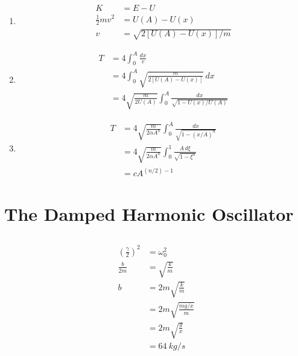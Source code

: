 \documentclass{article}
\begin{document}
\begin{enumerate}
  \item

        \begin{align*}
          K                 & = E - U                      \\
          \frac{1}{2} m v^2 & = U(A) - U(x)                \\
          v                 & = \sqrt{2 [U(A) - U(x)] / m}
        \end{align*}

  \item

        \begin{align*}
          T & = 4 \int_0^A \frac{dx}{v}                                              \\
            & = 4 \int_0^A \sqrt{\frac{m}{2 [U(A) - U(x)]}} \,dx                     \\
            & = 4 \sqrt{\frac{m}{2 U(A)}} \int_0^A \frac{dx}{\sqrt{1 - U(x) / U(A)}}
        \end{align*}

  \item

        \begin{align*}
          T & = 4 \sqrt{\frac{m}{2 \alpha A^n}} \int_0^A \frac{dx}{\sqrt{1 - (x / A)^n}}    \\
            & = 4 \sqrt{\frac{m}{2 \alpha A^n}} \int_0^1 \frac{A \,d \xi}{\sqrt{1 - \xi^n}} \\
            & = c A^{(n / 2) - 1}
        \end{align*}
\end{enumerate}

\section{The Damped Harmonic Oscillator}

\subsection{}

\begin{align*}
  \left( \frac{\gamma}{2} \right)^2 & = \omega_0^2                   \\
  \frac{b}{2 m}                     & = \sqrt{\frac{k}{m}}           \\
  b                                 & = 2 m \sqrt{\frac{k}{m}}       \\
                                    & = 2 m \sqrt{\frac{m g / x}{m}} \\
                                    & = 2 m \sqrt{\frac{g}{x}}       \\
                                    & = \qty{64}{kg / s}
\end{align*}
\end{document}
